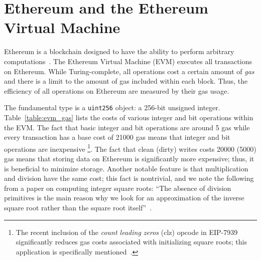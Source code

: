 \section{Ethereum and the Ethereum Virtual Machine}

Ethereum is a blockchain designed to have the ability
to perform arbitrary computations~\cite{EthereumYellowpaper}.
The Ethereum Virtual Machine (EVM) executes all transactions on Ethereum.
While Turing-complete,
all operations cost a certain amount of \emph{gas}
and there is a limit to the amount of gas included within each block.
Thus, the efficiency of all operations on Ethereum
are measured by their gas usage.

The fundamental type is a \texttt{uint256} object:
a 256-bit unsigned integer.
Table~\ref{table:evm_gas} lists the costs of various
integer and bit operations within the EVM.
The fact that basic integer and bit operations are around 5 gas
while every transaction has a base cost of \num{21000} gas
means that integer and bit operations are inexpensive%
\footnote{The recent inclusion of the \emph{count leading zeros} (\textsf{clz})
opcode in EIP-7939 significantly reduces gas costs associated
with initializing square roots;
this application is specifically mentioned~\cite[Motivation]{eip7939}.}.
The fact that clean (dirty) writes costs \num{20000} (\num{5000}) gas
means that storing data on Ethereum is significantly more expensive;
thus, it is beneficial to minimize storage.
Another notable feature is that multiplication and division
have the same cost;
this fact is nontrivial,
and we note the following from a paper on computing integer square roots:
``The absence of division primitives is the main reason why we look
for an approximation of the inverse square root rather than the
square root itself''~\cite[Section 2]{FormalVerIsqrt}.


